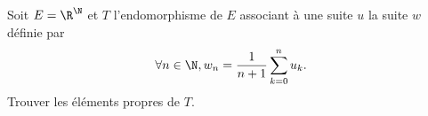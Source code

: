 \begin{enonce}
\begin{exercise}[ID={RMS130 E660},subtitle={Mines-Ponts PSI 2019},tags={}]
  Soit $E=\R^{\N}$ et $T$ l'endomorphisme de $E$ associant à une suite $u$ la suite $w$ définie par
  \begin{equation*}
    \forall n\in\N, w_n = \frac{1}{n+1} \sum_{k=0}^n u_k.
  \end{equation*}
  Trouver les éléments propres de $T$.
\end{exercise}
\begin{solution}
\end{solution}
\end{enonce}
